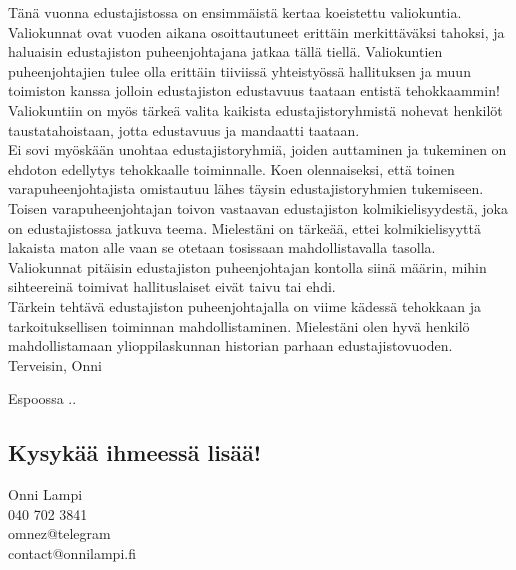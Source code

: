 \documentclass[a4paper, 12pt, finnish]{report}
\newcommand*{\findate}{\the\day.\the\month.\the\year}
\begin{document}
Tänä vuonna edustajistossa on ensimmäistä kertaa koeistettu valiokuntia.
Valiokunnat ovat vuoden aikana osoittautuneet erittäin merkittäväksi tahoksi, ja haluaisin edustajiston puheenjohtajana jatkaa tällä tiellä.
Valiokuntien puheenjohtajien tulee olla erittäin tiiviissä yhteistyössä hallituksen ja muun toimiston kanssa jolloin edustajiston edustavuus taataan entistä tehokkaammin!
Valiokuntiin on myös tärkeä valita kaikista edustajistoryhmistä nohevat henkilöt taustatahoistaan, jotta edustavuus ja mandaatti taataan.\\

Ei sovi myöskään unohtaa edustajistoryhmiä, joiden auttaminen ja tukeminen on ehdoton edellytys tehokkaalle toiminnalle.
Koen olennaiseksi, että toinen varapuheenjohtajista omistautuu lähes täysin edustajistoryhmien tukemiseen.
Toisen varapuheenjohtajan toivon vastaavan edustajiston kolmikielisyydestä, joka on edustajistossa jatkuva teema.
Mielestäni on tärkeää, ettei kolmikielisyyttä lakaista maton alle vaan se otetaan tosissaan mahdollistavalla tasolla.
Valiokunnat pitäisin edustajiston puheenjohtajan kontolla siinä määrin, mihin sihteereinä toimivat hallituslaiset eivät taivu tai ehdi.\\

Tärkein tehtävä edustajiston puheenjohtajalla on viime kädessä tehokkaan ja tarkoituksellisen toiminnan mahdollistaminen.
Mielestäni olen hyvä henkilö mahdollistamaan ylioppilaskunnan historian parhaan edustajistovuoden.\\


Terveisin, Onni

Espoossa \findate

\subsection*{Kysykää ihmeessä lisää!}
Onni Lampi\\
040 702 3841\\
omnez@telegram\\
contact@onnilampi.fi
\end{document}
